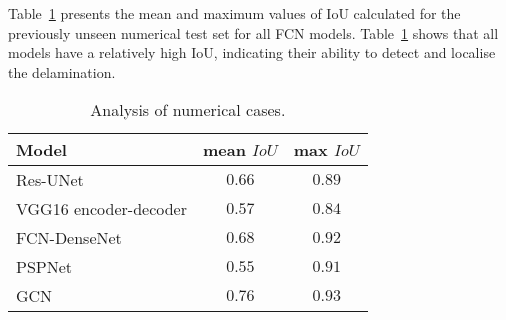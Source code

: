 Table~\ref{tab:table_all_numerical_cases} presents the mean and maximum values of IoU calculated for the previously unseen numerical test set for all FCN models.
Table~\ref{tab:table_all_numerical_cases} shows that all models have a relatively high IoU, indicating their ability to detect and localise the delamination.
\begin{table}[ht!]
	\centering
	\caption{Analysis of numerical cases.}
	\label{tab:table_all_numerical_cases}	
	\begin{tabular}{lcc}
		\toprule
		Model & mean \(IoU\) & max \(IoU\) \\ 
		\midrule 
		Res-UNet & \(0.66\) & \(0.89\) \\ 
		VGG16 encoder-decoder & \(0.57\) & \(0.84\) \\ 
		FCN-DenseNet & \(0.68\) & \(0.92\) \\ 
		PSPNet & \(0.55\) & \(0.91\) \\ 
		GCN & \(0.76\) & \(0.93\) \\ 
		\bottomrule
	\end{tabular}
	
\end{table}
\clearpage
